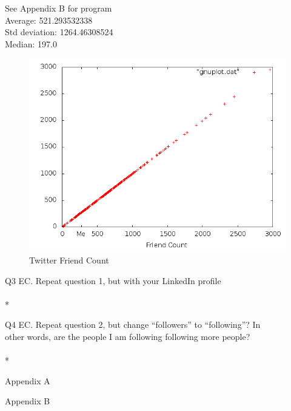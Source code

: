 \documentclass{article}
\begin{document}
See Appendix B for program\\
Average: 521.293532338\\
Std deviation: 1264.46308524\\
Median: 197.0\\
\graphicspath{{q2/}}
\begin{figure}[H]
  \centering
  \caption{Twitter Friend Count}
  \includegraphics[scale=.45]{scatter.png}
\end{figure}
\clearpage

Q3 EC. Repeat question 1, but with your LinkedIn profile\\
\\*

Q4 EC. Repeat question 2, but change ``followers'' to ``following''?  In\\
other words, are the people I am following following more people?\\
\\*

\appendix
\newpage
Appendix A


\newpage
Appendix B

\end{document}
